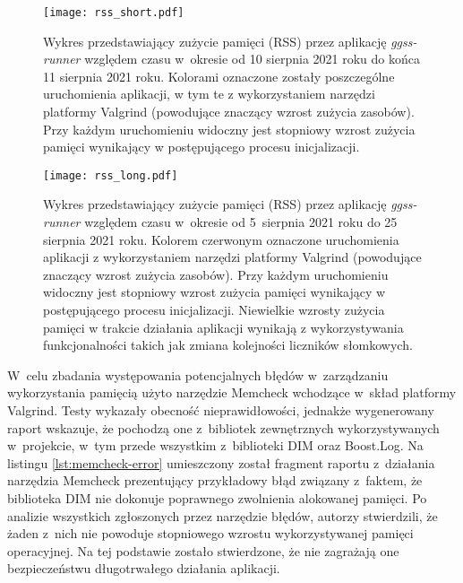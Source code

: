 \begin{figure}[H]
    \centering
    \texttt{[image: rss\_short.pdf]}
    \caption{Wykres przedstawiający zużycie pamięci (RSS) przez aplikację \emph{ggss-runner} względem czasu w~okresie od 10 sierpnia 2021 roku do końca 11 sierpnia 2021 roku. Kolorami oznaczone zostały poszczególne uruchomienia aplikacji, w tym te z wykorzystaniem narzędzi platformy Valgrind (powodujące znaczący wzrost zużycia zasobów). Przy każdym uruchomieniu widoczny jest stopniowy wzrost zużycia pamięci wynikający w postępującego procesu inicjalizacji.}
    \label{fig:rss-short}
\end{figure}

\begin{figure}[H]
    \centering
    \texttt{[image: rss\_long.pdf]}
    \caption{Wykres przedstawiający zużycie pamięci (RSS) przez aplikację \emph{ggss-runner} względem czasu w~okresie od 5~sierpnia 2021 roku do 25 sierpnia 2021 roku. Kolorem czerwonym oznaczone uruchomienia aplikacji z wykorzystaniem narzędzi platformy Valgrind (powodujące znaczący wzrost zużycia zasobów). Przy każdym uruchomieniu widoczny jest stopniowy wzrost zużycia pamięci wynikający w postępującego procesu inicjalizacji. Niewielkie wzrosty zużycia pamięci w trakcie działania aplikacji wynikają z wykorzystywania funkcjonalności takich jak zmiana kolejności liczników słomkowych.}
    \label{fig:rss-long}
\end{figure}

W~celu zbadania występowania potencjalnych błędów w~zarządzaniu wykorzystania pamięcią użyto narzędzie Memcheck wchodzące w~skład platformy Valgrind. Testy wykazały obecność nieprawidłowości, jednakże wygenerowany raport wskazuje, że pochodzą one z~bibliotek zewnętrznych wykorzystywanych w~projekcie, w~tym przede wszystkim z~biblioteki DIM oraz Boost.Log. Na listingu \ref{lst:memcheck-error} umieszczony został fragment raportu z~działania narzędzia Memcheck prezentujący przykładowy błąd związany z~faktem, że biblioteka DIM nie dokonuje poprawnego zwolnienia alokowanej pamięci. Po analizie wszystkich zgłoszonych przez narzędzie błędów, autorzy stwierdzili, że żaden z~nich nie powoduje stopniowego wzrostu wykorzystywanej pamięci operacyjnej. Na tej podstawie zostało stwierdzone, że nie zagrażają one bezpieczeństwu długotrwałego działania aplikacji.



